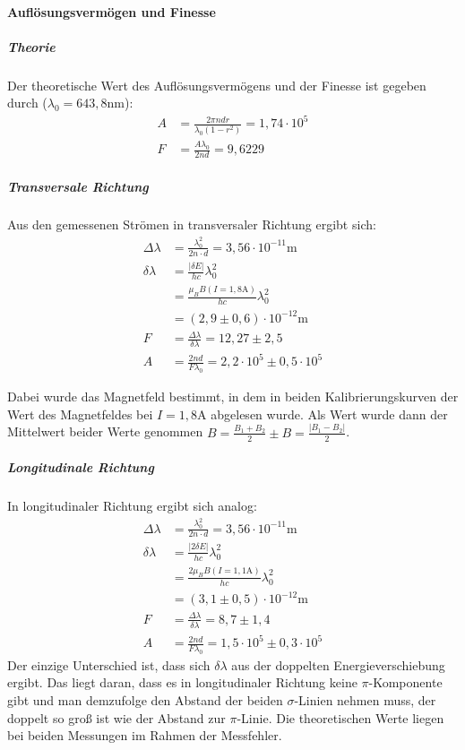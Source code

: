 \paragraph{Auflösungsvermögen und Finesse}
\subparagraph{Theorie}
Der theoretische Wert des Auflösungsvermögens und der Finesse ist gegeben durch ($\lambda_0 =643,8 \si{\nano\meter}$):
\begin{align*}
A &= \frac{2\pi n d r}{\lambda_0 (1-r^2)} = 1,74\cdot 10^5\\
F &= \frac{A \lambda_0}{2 n d} = 9,6229 
\end{align*}

\subparagraph{Transversale Richtung}
Aus den gemessenen Strömen in transversaler Richtung ergibt sich:
\begin{align*}
\Delta \lambda &= \frac{\lambda_0^2}{2n\cdot d} = 3,56 \cdot 10^{-11} \si{\meter}\\
\delta \lambda &= \frac{|\delta E|}{hc}\lambda_0^2\\
	&= \frac{\mu_B B(I = 1,8\si{\ampere})}{hc}\lambda_0^2\\
	&= (2,9\pm 0,6) \cdot 10^{-12} \si{\meter}\\
F &= \frac{\Delta \lambda}{\delta\lambda} = 12,27 \pm 2,5\\
A&= \frac{2 n d}{F \lambda_0} = 2,2\cdot 10^5 \pm 0,5 \cdot 10^5
\end{align*}

Dabei wurde das Magnetfeld bestimmt, in dem in beiden Kalibrierungskurven der Wert des Magnetfeldes bei $I = 1,8 \si{\ampere}$ abgelesen wurde. Als Wert wurde dann der Mittelwert beider Werte genommen $B = \frac{B_1+B_2}{2} \pm B = \frac{|B_1-B_2|}{2}$.\\

\subparagraph{Longitudinale Richtung}
In longitudinaler Richtung ergibt sich analog:
\begin{align*}
\Delta \lambda &= \frac{\lambda_0^2}{2n\cdot d} = 3,56 \cdot 10^{-11} \si{\meter}\\
\delta \lambda &= \frac{|2\delta E|}{hc}\lambda_0^2\\
	&= \frac{2\mu_B B(I = 1,1\si{\ampere})}{hc}\lambda_0^2\\
	&= (3,1\pm 0,5) \cdot 10^{-12} \si{\meter}\\
F &= \frac{\Delta \lambda}{\delta\lambda} = 8,7 \pm 1,4\\
A&= \frac{2 n d}{F \lambda_0} = 1,5\cdot 10^5 \pm 0,3 \cdot 10^5
\end{align*}
Der einzige Unterschied ist, dass sich $\delta \lambda$ aus der doppelten Energieverschiebung ergibt. Das liegt daran, dass es in longitudinaler Richtung keine $\pi$-Komponente gibt und man demzufolge den Abstand der beiden $\sigma$-Linien nehmen muss, der doppelt so groß ist wie der Abstand zur $\pi$-Linie. Die theoretischen Werte liegen bei beiden Messungen im Rahmen der Messfehler.\\

